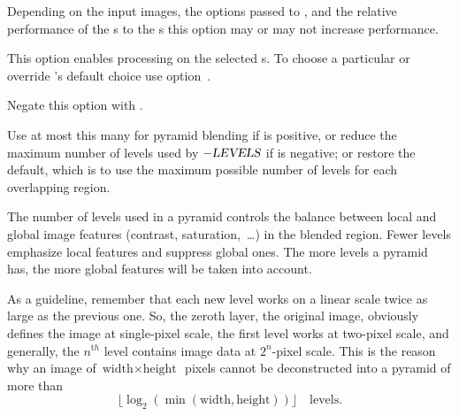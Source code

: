 \begin{codelist}
  Depending on the input images, the options passed to \App{}, and the relative performance of
  the s to the s this option may or may not increase performance.

  This option enables  processing on the selected s.  To choose a
  particular  or override \App's default choice use
  option~.

  Negate this option with .


  \label{opt:levels}%
\item[\itempar{-l \metavar{LEVELS} \\ --levels=\metavar{LEVELS}}]\itemend
  Use at most this many  for pyramid\footnotemark{} blending if 
  is positive, or reduce the maximum number of levels used by $-\textsl{LEVELS}$ if
   is negative;  or  restore the default, which
  is to use the maximum possible number of levels for each overlapping region.


  The number of levels used in a pyramid controls the balance between local and global image
  features (contrast, saturation,~\dots) in the blended region.  Fewer levels emphasize local
  features and suppress global ones.  The more levels a pyramid has, the more global features
  will be taken into account.

  \begin{geeknote}
    As a guideline, remember that each new level works on a linear scale twice as large as the
    previous one.  So, the zeroth layer, the original image, obviously defines the image at
    single-pixel scale, the first level works at two-pixel scale, and generally, the $n^{\mathrm
      th}$ level contains image data at $2^n$-pixel scale.  This is the reason why an image of
    $\mbox{width} \times \mbox{height}$~pixels cannot be deconstructed into a pyramid of more
    than
    \[
    \lfloor \log_2(\min(\mbox{width}, \mbox{height})) \rfloor\quad\mbox{levels.}
    \]


\end{geeknote}
\end{codelist}
